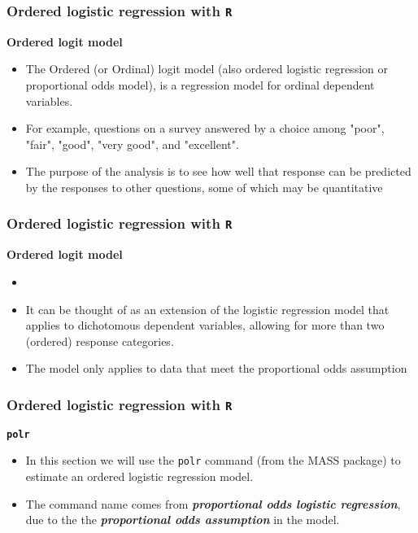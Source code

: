 \documentclass[00-GLMregslides.tex]{subfiles}
\begin{document}
\begin{frame}
\frametitle{Ordered logistic regression with \texttt{R} }
\textbf{Ordered logit model}

\begin{itemize}
\item The Ordered (or Ordinal) logit model (also ordered logistic regression or proportional odds model), is a regression model for ordinal dependent variables. 
\item For example, questions on a survey answered by a choice among "poor", "fair", "good", "very good", and "excellent".
\item The purpose of 
the analysis is to see how well that response can be predicted by the responses to other questions, some of which may be quantitative
\end{itemize}

\end{frame}

\begin{frame}
\frametitle{Ordered logistic regression with \texttt{R} }
\textbf{Ordered logit model}

\begin{itemize}
\item 
\item It can be thought of as an extension of the 
logistic regression model that applies to dichotomous dependent variables, allowing for more than two (ordered) response categories.
\item The model only applies to data that meet the proportional odds assumption
\end{itemize}
\end{frame}






\begin{frame}[fragile]
\frametitle{Ordered logistic regression with \texttt{R} }
	\Large
\textbf{\texttt{polr}}
\begin{itemize}
\item In this section we will use the \texttt{polr} command (from the MASS package) to estimate an ordered logistic 
regression model. 
\item The command name comes from \textbf{\textit{proportional odds logistic regression}}, due to the the \textbf{\textit{proportional odds assumption}} in the model. 
\end{itemize}
\end{frame}
\end{document}
